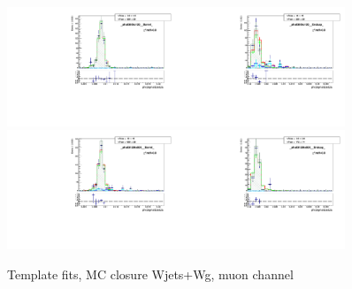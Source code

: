 \begin{figure}[htb]
\begin{center}
   \includegraphics[width=0.45\textwidth]{../figs/figs_v11/MUON_WGamma/MCclosureWjetsPlusWg/c_TEMPL_SIHIH_UNblind__phoEt95to120__Barrel__RooFit_MCclosure.pdf}\includegraphics[width=0.45\textwidth]{../figs/figs_v11/MUON_WGamma/MCclosureWjetsPlusWg/c_TEMPL_SIHIH_UNblind__phoEt95to120__Endcap__RooFit_MCclosure.pdf}\\
   \includegraphics[width=0.45\textwidth]{../figs/figs_v11/MUON_WGamma/MCclosureWjetsPlusWg/c_TEMPL_SIHIH_UNblind__phoEt120to500__Barrel__RooFit_MCclosure.pdf}\includegraphics[width=0.45\textwidth]{../figs/figs_v11/MUON_WGamma/MCclosureWjetsPlusWg/c_TEMPL_SIHIH_UNblind__phoEt120to500__Endcap__RooFit_MCclosure.pdf}\\
  \label{fig:templateFits_MCclosureWjetsPlusWg_SIHIH_MUON_3}
  \caption{Template fits, MC closure Wjets+Wg, muon channel}
  \end{center}
\end{figure}











